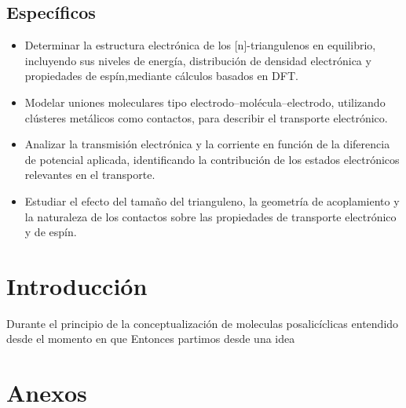 \documentclass{book}
\begin{document}
    \section*{Específicos}
\begin{itemize}
    \item Determinar la estructura electrónica de los [n]-triangulenos en equilibrio, incluyendo sus niveles de energía, distribución de densidad electrónica y propiedades de espín,mediante cálculos basados en DFT.
    \item Modelar uniones moleculares tipo electrodo–molécula–electrodo, utilizando clústeres metálicos como contactos, para describir el transporte electrónico.
    \item Analizar la transmisión electrónica y la corriente en función de la diferencia de potencial aplicada, identificando la contribución de los estados electrónicos relevantes en el transporte.
    \item Estudiar el efecto del tamaño del trianguleno, la geometría de acoplamiento y la naturaleza de los contactos sobre las propiedades de transporte electrónico y de espín.
\end{itemize}


\chapter*{Introducción}
Durante el principio de la conceptualización de moleculas posalicíclicas entendido desde el momento en que
Entonces partimos desde una idea











\printbibliography[heading=bibintoc, title={Bibliografía}]

\frontmatter
\chapter*{Anexos}
\end{document}
